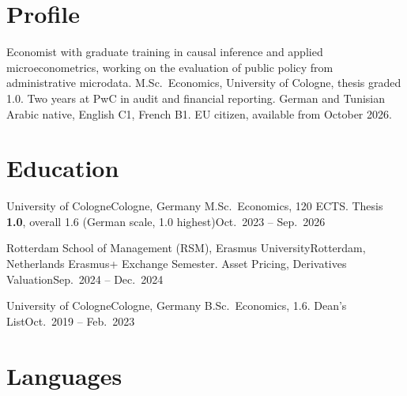 \documentclass[compact,mono,noicons]{../shared/OpenCV}
\begin{document}
\cvheader

\section*{Profile}
\small
Economist with graduate training in causal inference and applied microeconometrics, working on the evaluation of public policy from administrative microdata. M.Sc.\ Economics, University of Cologne, thesis graded 1.0. Two years at PwC in audit and financial reporting. German and Tunisian Arabic native, English C1, French B1. EU citizen, available from October 2026.

\section*{Education}
\resumeSubHeadingListStart

\resumeSubheading
{University of Cologne}{Cologne, Germany}
{M.Sc.\ Economics, 120 ECTS. Thesis \textbf{1.0}, overall 1.6 (German scale, 1.0 highest)}{Oct.\ 2023 -- Sep.\ 2026}
\resumeItemListStart
{}
\resumeItemListEnd

\resumeSubheading
{Rotterdam School of Management (RSM), Erasmus University}{Rotterdam, Netherlands}
{Erasmus+ Exchange Semester. Asset Pricing, Derivatives Valuation}{Sep.\ 2024 -- Dec.\ 2024}

\resumeSubheading
{University of Cologne}{Cologne, Germany}
{B.Sc.\ Economics, 1.6. Dean's List}{Oct.\ 2019 -- Feb.\ 2023}
\resumeItemListStart
{}
\resumeItemListEnd

\resumeSubHeadingListEnd

\section*{Languages}
\resumeItemListStart
{}
\resumeItemListEnd
\end{document}
